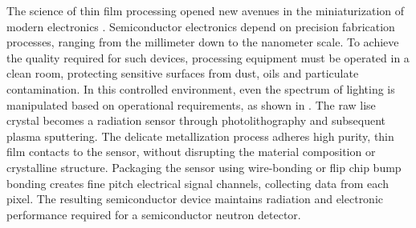 \documentclass[../../main.tex]{subfiles}%
\begin{document}
%
    \Xsection%
    The science of thin film processing opened new avenues in the miniaturization of modern electronics \cite{book:Ohring_2001}.
    Semiconductor electronics depend on precision fabrication processes, ranging from the millimeter down to the nanometer scale.
    To achieve the quality required for such devices, processing equipment must be operated in a clean room, protecting sensitive surfaces from dust, oils and particulate contamination.
    In this controlled environment, even the spectrum of lighting is manipulated based on operational requirements, as shown in .
    The raw \gls{lise} crystal becomes a radiation sensor through photolithography and subsequent plasma sputtering.
    The delicate metallization process adheres high purity, thin film contacts to the sensor, without disrupting the material composition or crystalline structure.
    Packaging the sensor using wire-bonding or flip chip bump bonding creates fine pitch electrical signal channels, collecting data from each pixel.
    The resulting semiconductor device maintains radiation and electronic performance required for a semiconductor neutron detector.
\end{document}
